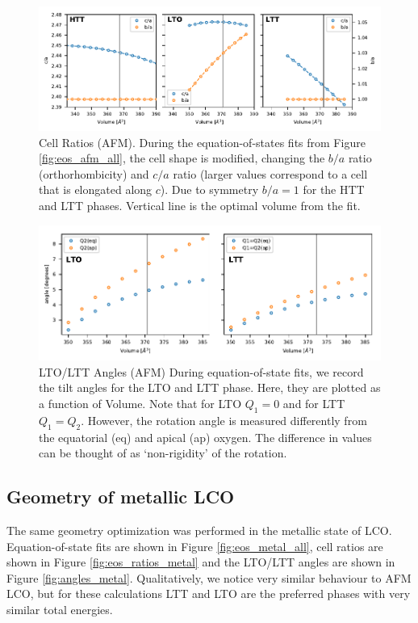 \begin{figure}
    \centering
    \includegraphics[width=\textwidth]{fig/simulation/ratio_all.pdf}
    \caption[AFM: Cell ratios during EOS fits]{Cell Ratios (AFM). During the equation-of-states fits from Figure \ref{fig:eos_afm_all}, the cell shape is modified, changing the $b/a$ ratio (orthorhombicity) and $c/a$ ratio (larger values correspond to a cell that is elongated along $c$). Due to symmetry $b/a = 1$ for the HTT and LTT phases. Vertical line is the optimal volume from the fit.}
    \label{fig:eos_ratios_afm}
\end{figure}

\begin{figure}
    \centering
    \includegraphics[width=\textwidth]{fig/simulation/angles_lto_ltt.pdf}
    \caption[AFM: LTO/LTT angles during EOS fits]{LTO/LTT Angles (AFM) During equation-of-state fits, we record the tilt angles for the LTO and LTT phase. Here, they are plotted as a function of Volume. Note that for LTO $Q_1=0$ and for LTT $Q_1=Q_2$. However, the rotation angle is measured differently from the equatorial (eq) and apical (ap) oxygen. The difference in values can be thought of as `non-rigidity' of the rotation.}
    \label{fig:angles_afm}
\end{figure}

\subsection{Geometry of metallic LCO}
The same geometry optimization was performed in the metallic state of LCO. Equation-of-state fits are shown in Figure \ref{fig:eos_metal_all}, cell ratios are shown in Figure \ref{fig:eos_ratios_metal} and the LTO/LTT angles are shown in Figure \ref{fig:angles_metal}. Qualitatively, we notice very similar behaviour to AFM LCO, but for these calculations LTT and LTO are the preferred phases with very similar total energies.


